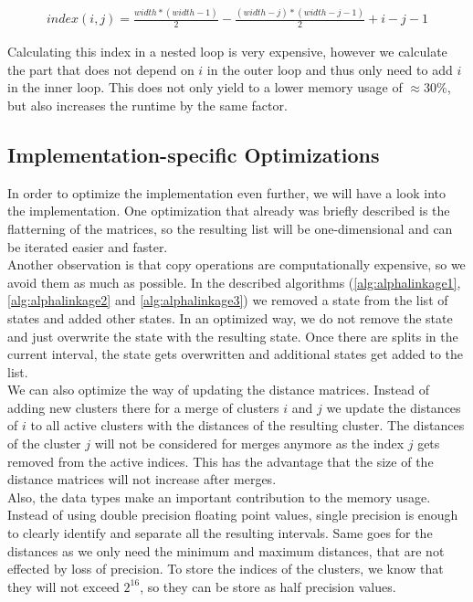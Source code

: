 \begin{equation}
    \begin{aligned}
        index(i,j) = \frac{width * (width - 1)}{2} - \frac{(width - j) * (width - j - 1)}{2} + i - j - 1
    \end{aligned}
    \label{eq:indexing}
\end{equation}

Calculating this index in a nested loop is very expensive, however we calculate the part that does not depend on $i$ in the outer loop and thus only need to add $i$ in the inner loop. This does not only yield to a lower memory usage of $\approx 30\%$, but also increases the runtime by the same factor.

\subsection{Implementation-specific Optimizations}

In order to optimize the implementation even further, we will have a look into the implementation. One optimization that already was briefly described is the flatterning of the matrices, so the resulting list will be one-dimensional and can be iterated easier and faster.\\

Another observation is that copy operations are computationally expensive, so we avoid them as much as possible. In the described algorithms (\ref{alg:alphalinkage1}, \ref{alg:alphalinkage2} and \ref{alg:alphalinkage3}) we removed a state from the list of states and added other states. In an optimized way, we do not remove the state and just overwrite the state with the resulting state. Once there are splits in the current interval, the state gets overwritten and additional states get added to the list.\\

We can also optimize the way of updating the distance matrices. Instead of adding new clusters there for a merge of clusters $i$ and $j$ we update the distances of $i$ to all active clusters with the distances of the resulting cluster. The distances of the cluster $j$ will not be considered for merges anymore as the index $j$ gets removed from the active indices. This has the advantage that the size of the distance matrices will not increase after merges.\\

Also, the data types make an important contribution to the memory usage. Instead of using double precision floating point values, single precision is enough to clearly identify and separate all the resulting intervals. Same goes for the distances as we only need the minimum and maximum distances, that are not effected by loss of precision. To store the indices of the clusters, we know that they will not exceed $2^{16}$, so they can be store as half precision values.